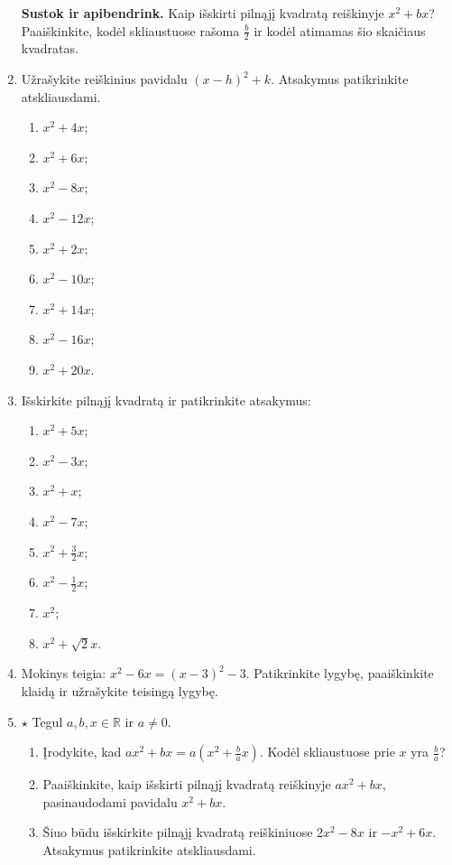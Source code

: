\documentclass[12pt,a4paper]{article}
\begin{document}
\begin{enumerate}
\textbf{Sustok ir apibendrink.} Kaip išskirti pilnąjį kvadratą reiškinyje $x^2+bx$? Paaiškinkite, kodėl skliaustuose rašoma $\frac b2$ ir kodėl atimamas šio skaičiaus kvadratas.

\item Užrašykite reiškinius pavidalu $(x-h)^2+k$. Atsakymus patikrinkite atskliausdami.
\begin{multicols}{3}\begin{enumerate}
\item $x^2+4x$; \item $x^2+6x$; \item $x^2-8x$; \item $x^2-12x$; \item $x^2+2x$; \item $x^2-10x$; \item $x^2+14x$; \item $x^2-16x$; \item $x^2+20x$.
\end{enumerate}\end{multicols}
\item Išskirkite pilnąjį kvadratą ir patikrinkite atsakymus:
\begin{multicols}{2}\begin{enumerate}
\item $x^2+5x$; \item $x^2-3x$; \item $x^2+x$; \item $x^2-7x$; \item $x^2+\frac{3}{2}x$; \item $x^2-\frac{1}{2}x$; \item $x^2$; \item $x^2+\sqrt{2}x$.
\end{enumerate}\end{multicols}
\item Mokinys teigia: $x^2-6x=(x-3)^2-3$. Patikrinkite lygybę, paaiškinkite klaidą ir užrašykite teisingą lygybę.
\item $\star$ Tegul $a,b,x\in\mathbb R$ ir $a\ne0$.
\begin{enumerate}
\item Įrodykite, kad $ax^2+bx=a\left(x^2+\frac{b}{a}x\right)$. Kodėl skliaustuose prie $x$ yra $\frac{b}{a}$?
\item Paaiškinkite, kaip išskirti pilnąjį kvadratą reiškinyje $ax^2+bx$, pasinaudodami pavidalu $x^2+bx$.
\item Šiuo būdu išskirkite pilnąjį kvadratą reiškiniuose $2x^2-8x$ ir $-x^2+6x$. Atsakymus patikrinkite atskliausdami.
\end{enumerate}


\end{enumerate}
\end{document}
